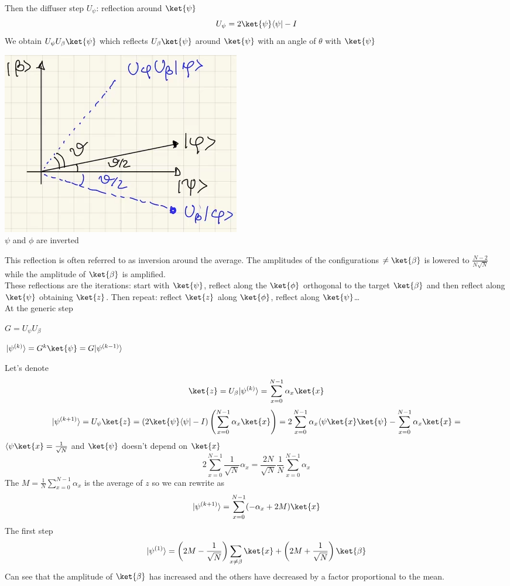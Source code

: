 \documentclass[10pt]{report}
\begin{document}
Then the diffuser step $U_\psi$: reflection around $\ket{\psi}$
$$U_\psi = 2\ket{\psi}\langle\psi|-I$$
We obtain $U_\psi U_\beta\ket{\psi}$ which reflects $U_\beta\ket{\psi}
$ around $\ket{\psi}$ with an angle of $\theta$ with $\ket{\psi}$
\begin{center}
	\includegraphics[scale=0.5]{35.png}\\
	$\psi$ and $\phi$ are inverted
\end{center}
This reflection is often referred to as inversion around the average. The amplitudes of the configurations $\neq\ket{\beta}$ is lowered to $\frac{N-2}{N\sqrt{N}}$ while the amplitude of $\ket{\beta}$ is amplified.\\
These reflections are the iterations: start with $\ket{\psi}$, reflect along the $\ket{\phi}$ orthogonal to the target $\ket{\beta}$ and then reflect along $\ket{\psi}$ obtaining $\ket{z}$. Then repeat: reflect $\ket{z}$ along $\ket{\phi}$, reflect along $\ket{\psi}$\ldots\\At the generic step\begin{list}{}{}
	\item $G=U_\psi U_\beta$
	\item $|\psi^{(k)}\rangle = G^k\ket{\psi} = G|\psi^{(k-1)}\rangle$
\end{list}
Let's denote
$$\ket{z} = U_\beta|\psi^{(k)}\rangle = \sum_{x=0}^{N-1}\alpha_x\ket{x}$$
$$|\psi^{(k+1)}\rangle=U_\psi\ket{z} = (2\ket{\psi}\langle\psi| - I)\left(\sum_{x=0}^{N-1}\alpha_x\ket{x}\right) = 2\sum_{x=0}^{N-1}\alpha_x\langle\psi\ket{x}\ket{\psi}-\sum_{x=0}^{N-1}\alpha_x\ket{x} = $$
$\langle\psi\ket{x} = \frac{1}{\sqrt{N}}$ and $\ket{\psi}$ doesn't depend on $\ket{x}$
$$2\sum_{x=0}^{N-1}\frac{1}{\sqrt{N}}\alpha_x = \frac{2N}{\sqrt{N}}\frac{1}{N}\sum_{x=0}^{N-1}\alpha_x$$
The $M = \frac{1}{N}\sum_{x=0}^{N-1}\alpha_x$ is the average of $z$ so we can rewrite as
$$|\psi^{(k+1)}\rangle=\sum_{x=0}^{N-1}(-\alpha_x + 2M)\ket{x}$$
The first step
$$|\psi^{(1)}\rangle = \left(2M-\frac{1}{\sqrt{N}}\right)\sum_{x\neq\beta}\ket{x}+\left(2M+\frac{1}{\sqrt{N}}\right)\ket{\beta}$$
Can see that the amplitude of $\ket{\beta}$ has increased and the others have decreased by a factor proportional to the mean.
\end{document}
